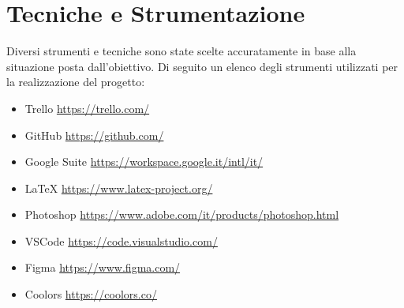 \documentclass{report}
\begin{document}
\chapter{Tecniche e Strumentazione}
Diversi strumenti e tecniche sono state scelte accuratamente in base alla situazione posta dall’obiettivo. Di seguito un elenco degli strumenti utilizzati per la realizzazione del progetto:

\begin{itemize}
	\item Trello \qquad \url{https://trello.com/}
	\item GitHub \qquad \url{https://github.com/}
	\item Google Suite \qquad \url{https://workspace.google.it/intl/it/}
	\item LaTeX \qquad \url{https://www.latex-project.org/}
	\item Photoshop \qquad \url{https://www.adobe.com/it/products/photoshop.html}
	\item VSCode \qquad \url{https://code.visualstudio.com/}
	\item Figma \qquad \url{https://www.figma.com/}
	\item Coolors \qquad \url{https://coolors.co/}
\end{itemize}
\end{document}
